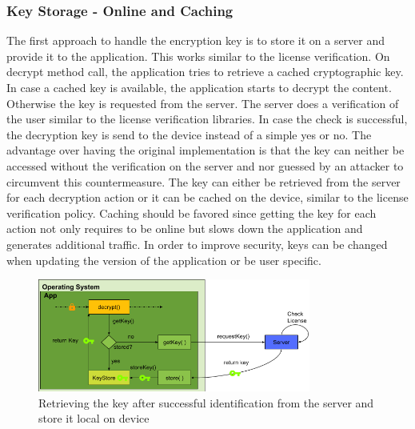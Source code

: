 \subsubsection{Key Storage - Online and Caching} \label{section:counter-replace-encryption-key-online}
The first approach to handle the encryption key is to store it on a server and provide it to the application.
This works similar to the license verification.
\newline
On decrypt method call, the application tries to retrieve a cached cryptographic key.
In case a cached key is available, the application starts to decrypt the content.
Otherwise the key is requested from the server.
The server does a verification of the user similar to the license verification libraries.
In case the check is successful, the decryption key is send to the device instead of a simple yes or no.
The advantage over having the original implementation is that the key can neither be accessed without the verification on the server and nor guessed by an attacker to circumvent this countermeasure.
\newline
The key can either be retrieved from the server for each decryption action or it can be cached on the device, similar to the license verification policy.
Caching should be favored since getting the key for each action not only requires to be online but slows down the application and generates additional traffic.
\newline
In order to improve security, keys can be changed when updating the version of the application or be user specific.
\begin{figure}[h]
    \centering
    \includegraphics[width=0.8\textwidth]{data/encryptionKeyServer.png}
    \caption{Retrieving the key after successful identification from the server and store it local on device}
    \label{fig:encryptionKeyServer}
\end{figure}
